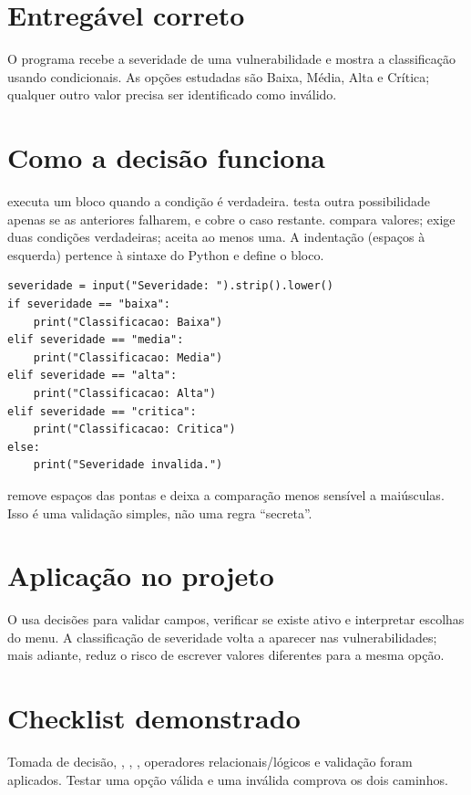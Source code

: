 \documentclass[11pt,a4paper]{article}
\begin{document}
\section*{Entregável correto}
O programa recebe a severidade de uma vulnerabilidade e mostra a classificação usando condicionais. As opções estudadas são Baixa, Média, Alta e Crítica; qualquer outro valor precisa ser identificado como inválido.
\section*{Como a decisão funciona}
 executa um bloco quando a condição é verdadeira.  testa outra possibilidade apenas se as anteriores falharem, e  cobre o caso restante. \codigo{==} compara valores;  exige duas condições verdadeiras;  aceita ao menos uma. A indentação (espaços à esquerda) pertence à sintaxe do Python e define o bloco.
\begin{lstlisting}
severidade = input("Severidade: ").strip().lower()
if severidade == "baixa":
    print("Classificacao: Baixa")
elif severidade == "media":
    print("Classificacao: Media")
elif severidade == "alta":
    print("Classificacao: Alta")
elif severidade == "critica":
    print("Classificacao: Critica")
else:
    print("Severidade invalida.")
\end{lstlisting}
 remove espaços das pontas e  deixa a comparação menos sensível a maiúsculas. Isso é uma validação simples, não uma regra ``secreta''.
\section*{Aplicação no projeto}
O  usa decisões para validar campos, verificar se existe ativo e interpretar escolhas do menu. A classificação de severidade volta a aparecer nas vulnerabilidades; mais adiante,  reduz o risco de escrever valores diferentes para a mesma opção.
\section*{Checklist demonstrado}
Tomada de decisão, , , , operadores relacionais/lógicos e validação foram aplicados. Testar uma opção válida e uma inválida comprova os dois caminhos.
\end{document}
